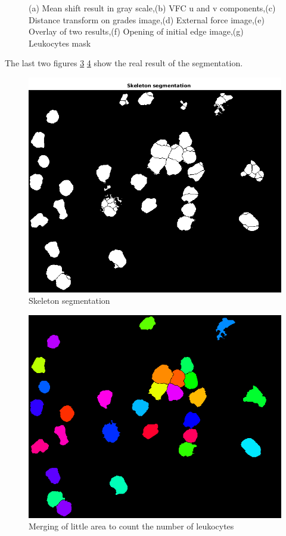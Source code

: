 \begin{figure}[htbp]
\begin{subfigure}[b]{0.45\textwidth}
        \caption{ }
        \label{fig:fig7}
    \end{subfigure}

    
    \caption{(a) Mean shift result in gray scale,(b) VFC u and v components,(c) Distance transform on grades image,(d) External force image,(e) Overlay of two results,(f) Opening of initial edge image,(g) Leukocytes mask}
    \label{fig:alltheprocess}
\end{figure}
The last two figures \ref{fig:fig8} \ref{fig:fig9} show the real result of the segmentation.

\begin{figure}
\centering
	\begin{center}
		\includegraphics[scale=0.5]{img/final/figure8.png}
		\caption{Skeleton segmentation}
		\label{fig:fig8}
	\end{center}
\end{figure}
\begin{figure}
\centering
	\begin{center}
		\includegraphics[scale=0.5]{img/final/untitled.png}
		\caption{Merging of little area to count the number of leukocytes}
		\label{fig:fig9}
	\end{center}
\end{figure}
